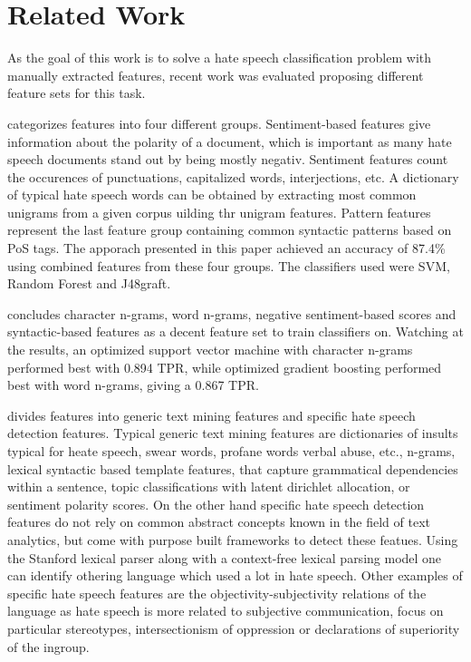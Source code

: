 \newpage
\section{Related Work} \label{related_work}

As the goal of this work is to solve a hate speech classification problem with manually extracted features, recent work was evaluated proposing different feature sets for this task. 

\cite{Watanabe2018} categorizes features into four different groups. Sentiment-based features give information about the polarity of a document, which is important as many hate speech documents stand out by being mostly negativ. Sentiment features count the occurences of punctuations, capitalized words, interjections, etc. A dictionary of typical hate speech words can be obtained by extracting most common unigrams from a given corpus uilding thr unigram features. Pattern features represent the last feature group containing common syntactic patterns based on PoS tags. The apporach presented in this paper achieved an accuracy of 87.4\% using combined features from these four groups. The classifiers used were SVM, Random Forest and J48graft.

\cite{Oriola2020} concludes character n-grams, word n-grams, negative sentiment-based scores and syntactic-based features as a decent feature set to train classifiers on. Watching at the results, an optimized support vector machine with character n-grams performed best with 0.894 TPR, while optimized gradient boosting performed best with word n-grams, giving a 0.867 TPR. 

\cite{Fortuna2018} divides features into generic text mining features and specific hate speech detection features. Typical generic text mining features are dictionaries of insults typical for heate speech, swear words, profane words verbal abuse, etc., n-grams, lexical syntactic based template features, that capture grammatical dependencies within a sentence, topic classifications with latent dirichlet allocation, or sentiment polarity scores. On the other hand specific hate speech detection features do not rely on common abstract concepts known in the field of text analytics, but come with purpose built frameworks to detect these featues. Using the Stanford lexical parser along with a context-free lexical parsing model one can identify othering language which used a lot in hate speech. Other examples of specific hate speech features are the objectivity-subjectivity relations of the language as hate speech is more related to subjective communication, focus on particular stereotypes, intersectionism of oppression or declarations of superiority of the ingroup. 

